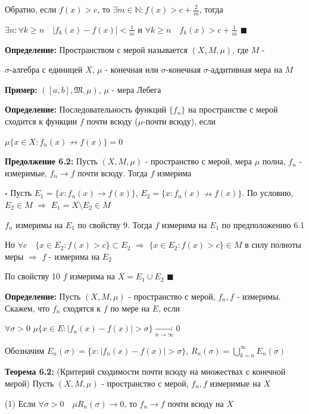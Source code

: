 \documentclass[a4paper]{report}
\begin{document}
Обратно, если $f(x)>c$, то $\exists m\in\mathbb N\colon f(x)>c+\frac2m$, тогда 

$\exists n\colon\forall k\ge n\quad|f_k(x)-f(x)|<\frac1m$ и $\forall k\ge n\quad f_k(x)>c+\frac1m$ $\blacksquare$
\bigskip

\noindent\textbf{Определение:} Пространством с мерой называется $(X,M,\mu)$, где $M$ - 

$\sigma$-алгебра с единицей $X$, $\mu$ - конечная или $\sigma$-конечная $\sigma$-аддитивная мера на $M$
\bigskip

\noindent\textbf{Пример:} $([a,b],\mathfrak M,\mu)$, $\mu$ - мера Лебега
\bigskip

\noindent\textbf{Определение:} Последовательность функций $\{f_n\}$ на пространстве с мерой сходится к функции $f$ почти всюду ($\mu$-почти всюду), если 

$\mu\{x\in X\colon f_n(x)\nrightarrow f(x)\}=0$
\bigskip

\noindent\textbf{Предолжение 6.2:} Пусть $(X,M,\mu)$ - пространство с мерой, мера $\mu$ полна, $f_n$ - измеримые, $f_n\to f$ почти всюду. Тогда $f$ измерима

\noindent $\square$ Пусть $E_1=\{x\colon f_n(x)\to f(x)\}$, $E_2=\{x\colon f_n(x)\nrightarrow f(x)\}$. По условию, $E_2\in M$ $\Rightarrow$ $E_1=X\setminus E_2\in M$

$f_n$ измеримы на $E_1$ по свойству 9. Тогда $f$ измерима на $E_1$ по предположению 6.1

Но $\forall c\quad\{x\in E_2\colon f(x)>c\}\subset E_2$ $\Rightarrow$ $\{x\in E_2\colon f(x)>c\}\in M$ в силу полноты меры $\Rightarrow$ $f$ - измерима на $E_2$

По свойству 10 $f$ измерима на $X=E_1\cup E_2$ $\blacksquare$
\bigskip

\noindent\textbf{Определение:} Пусть $(X,M,\mu)$ - пространство с мерой, $f_n,f$ - измеримы. Скажем, что $f_n$ сходятся к $f$ по мере на $E$, если 

$\forall\sigma>0$ $\mu\{x\in E\colon|f_n(x)-f(x)|>\sigma\}\xrightarrow[n\to\infty]{}0$

Обозначим $E_n(\sigma)=\{x\colon|f_n(x)-f(x)|>\sigma\}$, $R_n(\sigma)=\bigcup\limits_{k=n}^\infty E_n(\sigma)$
\bigskip

\noindent\textbf{Теорема 6.2:} (Критерий сходимости почти всюду на множествах с конечной мерой) Пусть $(X,M,\mu)$ - пространство с мерой, $f_n,f$ измеримые на $X$

(1) Если $\forall\sigma>0\quad\mu R_n(\sigma)\to0$, то $f_n\to f$ почти всюду на $X$
\end{document}
